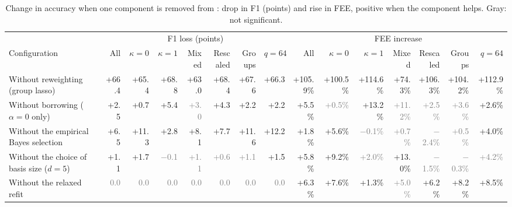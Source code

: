 \begin{table}[t]
\caption{Change in accuracy when one component is removed from \sys{}: drop in F1 (points) and rise in FEE, positive when the component helps. Gray: not significant.}
\label{tab:attribution}
\centering
\footnotesize
\setlength{\tabcolsep}{2.4pt}
\begin{tabular*}{\textwidth}{@{\extracolsep{\fill}}lrrrrrrrrrrrrrr@{}}
\toprule
& \multicolumn{7}{c}{F1 loss (points)} & \multicolumn{7}{c}{FEE increase}\\
\cmidrule(lr){2-8}\cmidrule(lr){9-15}
Configuration & All & $\kappa=0$ & $\kappa=1$ & Mixed & Rescaled & Groups & $q=64$ & All & $\kappa=0$ & $\kappa=1$ & Mixed & Rescaled & Groups & $q=64$\\
\midrule
Without reweighting (group lasso) & +66.4 & +65.4 & +68.8 & +63.0 & +68.4 & +67.6 & +66.3 & +105.9\% & +100.5\% & +114.6\% & +74.3\% & +106.3\% & +104.2\% & +112.9\%\\
Without borrowing ($\alpha=0$ only) & +2.5 & +0.7 & +5.4 & \textcolor{gray}{+3.0} & +4.3 & +2.2 & +2.2 & +5.5\% & \textcolor{gray}{+0.5\%} & +13.2\% & \textcolor{gray}{+11.2\%} & \textcolor{gray}{+2.5\%} & \textcolor{gray}{+3.6\%} & +2.6\%\\
Without the empirical Bayes selection & +6.5 & +11.3 & +2.8 & +8.1 & +7.7 & +11.6 & +12.2 & +1.8\% & +5.6\% & \textcolor{gray}{$-$0.1\%} & \textcolor{gray}{+0.7\%} & \textcolor{gray}{$-$2.4\%} & \textcolor{gray}{+0.5\%} & +4.0\%\\
Without the choice of basis size ($d=5$) & +1.1 & +1.7 & \textcolor{gray}{$-$0.1} & \textcolor{gray}{+1.1} & \textcolor{gray}{+0.6} & \textcolor{gray}{+1.1} & +1.5 & +5.8\% & +9.2\% & \textcolor{gray}{+2.0\%} & +13.0\% & \textcolor{gray}{$-$1.5\%} & \textcolor{gray}{$-$0.3\%} & \textcolor{gray}{+4.2\%}\\
Without the relaxed refit & \textcolor{gray}{0.0} & \textcolor{gray}{0.0} & \textcolor{gray}{0.0} & \textcolor{gray}{0.0} & \textcolor{gray}{0.0} & \textcolor{gray}{0.0} & \textcolor{gray}{0.0} & +6.3\% & +7.6\% & +1.3\% & \textcolor{gray}{+5.0\%} & +6.2\% & +8.2\% & +8.5\%\\
\bottomrule
\end{tabular*}
\end{table}
